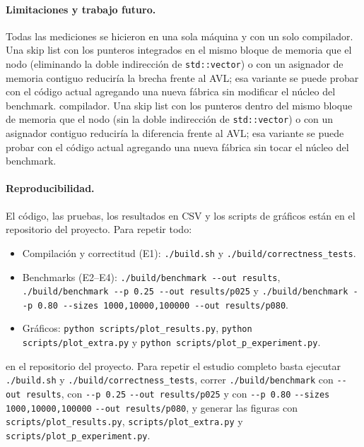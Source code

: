 \documentclass[11pt,a4paper]{article}
\begin{document}
\paragraph{Limitaciones y trabajo futuro.}
Todas las mediciones se hicieron en una sola máquina y con un solo
compilador. Una skip list con los punteros integrados en el mismo bloque de
memoria que el nodo (eliminando la doble indirección de \texttt{std::vector})
o con un asignador de memoria contiguo reduciría la brecha frente al AVL; esa
variante se puede probar con el código actual agregando una nueva fábrica sin
modificar el núcleo del benchmark.
compilador. Una skip list con los punteros dentro del mismo bloque de memoria
que el nodo (sin la doble indirección de \texttt{std::vector}) o con un
asignador contiguo reduciría la diferencia frente al AVL; esa variante se puede
probar con el código actual agregando una nueva fábrica sin tocar el núcleo del
benchmark.

\paragraph{Reproducibilidad.}
El código, las pruebas, los resultados en CSV y los scripts de gráficos están
en el repositorio del proyecto. Para repetir todo:
\begin{itemize}[leftmargin=1.4em, itemsep=1pt, topsep=2pt]
  \item Compilación y correctitud (E1): \texttt{./build.sh} y \texttt{./build/correctness\_tests}.
  \item Benchmarks (E2--E4): \texttt{./build/benchmark -{}-out results},
  \texttt{./build/benchmark -{}-p 0.25 -{}-out results/p025} y
  \texttt{./build/benchmark -{}-p 0.80 -{}-sizes 1000,10000,100000 -{}-out results/p080}.
  \item Gráficos: \texttt{python scripts/plot\_results.py},
  \texttt{python scripts/plot\_extra.py} y \texttt{python scripts/plot\_p\_experiment.py}.
\end{itemize}
en el repositorio del proyecto. Para repetir el estudio completo basta ejecutar
\texttt{./build.sh} y \texttt{./build/correctness\_tests}, correr
\texttt{./build/benchmark} con \texttt{-{}-out results}, con
\texttt{-{}-p 0.25} \texttt{-{}-out results/p025} y con
\texttt{-{}-p 0.80} \texttt{-{}-sizes 1000,10000,100000}
\texttt{-{}-out results/p080}, y generar las figuras con
\texttt{scripts/plot\_results.py}, \texttt{scripts/plot\_extra.py} y
\texttt{scripts/plot\_p\_experiment.py}.
\end{document}
